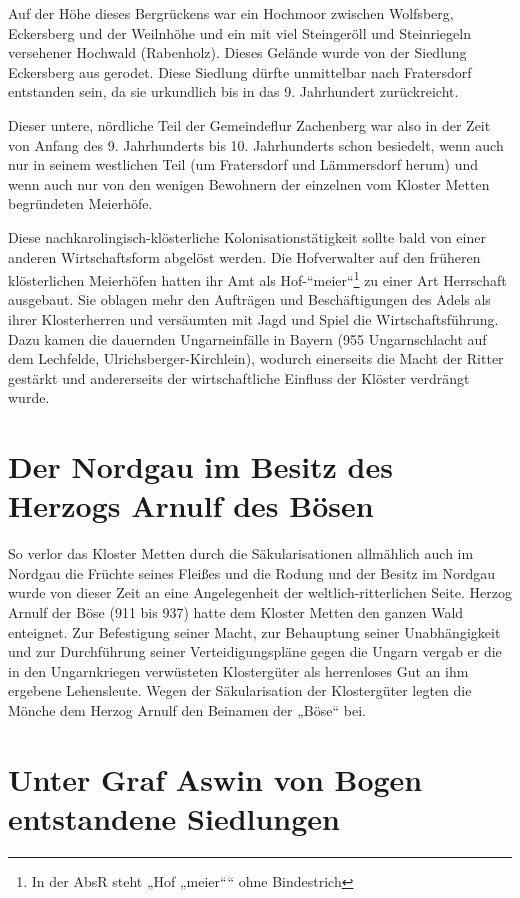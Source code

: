 \documentclass[12pt,a4pager,draft]{book}
\begin{document}
Auf der Höhe dieses Bergrückens war ein Hochmoor zwischen Wolfsberg, Eckersberg
und der Weilnhöhe und ein mit viel Steingeröll und Steinriegeln versehener
Hochwald (Rabenholz). Dieses Gelände wurde von der Siedlung Eckersberg aus
gerodet. Diese Siedlung dürfte unmittelbar nach Fratersdorf entstanden sein, da
sie urkundlich bis in das 9. Jahrhundert zurückreicht.

Dieser untere, nördliche Teil der Gemeindeflur Zachenberg war also in der Zeit
von Anfang des 9. Jahrhunderts bis 10. Jahrhunderts schon besiedelt, wenn auch
nur in seinem westlichen Teil (um Fratersdorf und  Lämmersdorf herum) und wenn
auch nur von den wenigen Bewohnern der einzelnen vom Kloster Metten begründeten
Meierhöfe.

Diese nachkarolingisch-klösterliche Kolonisationstätigkeit sollte bald von einer
anderen Wirtschaftsform abgelöst werden. Die Hofverwalter auf den früheren
klösterlichen Meierhöfen hatten ihr Amt als Hof-“meier“\footnote{In der AbsR
steht „Hof „meier““ ohne Bindestrich} zu einer Art Herrschaft ausgebaut. Sie
oblagen mehr den Aufträgen und Beschäftigungen des Adels als ihrer Klosterherren
und versäumten mit Jagd und Spiel die Wirtschaftsführung. Dazu kamen die
dauernden Ungarneinfälle in Bayern (955 Ungarnschlacht auf dem Lechfelde,
Ulrichsberger-Kirchlein), wodurch einerseits die Macht der Ritter gestärkt und
andererseits der wirtschaftliche Einfluss der Klöster verdrängt wurde.

\section{Der Nordgau im Besitz des Herzogs Arnulf des Bösen}

So verlor das Kloster Metten durch die Säkularisationen allmählich auch im
Nordgau die Früchte seines Fleißes und die Rodung und der Besitz im Nordgau
wurde von dieser Zeit an eine Angelegenheit der weltlich-ritterlichen Seite.
Herzog Arnulf der Böse (911 bis 937) hatte dem Kloster Metten den ganzen Wald
enteignet. Zur Befestigung seiner Macht, zur Behauptung seiner Unabhängigkeit
und zur Durchführung seiner Verteidigungspläne gegen die Ungarn vergab er die in
den Ungarnkriegen verwüsteten Klostergüter als herrenloses Gut an ihm ergebene
Lehensleute. Wegen der Säkularisation der Klostergüter legten die Mönche dem
Herzog Arnulf den Beinamen der „Böse“ bei.

\section{Unter Graf Aswin von Bogen entstandene Siedlungen}
\end{document}
